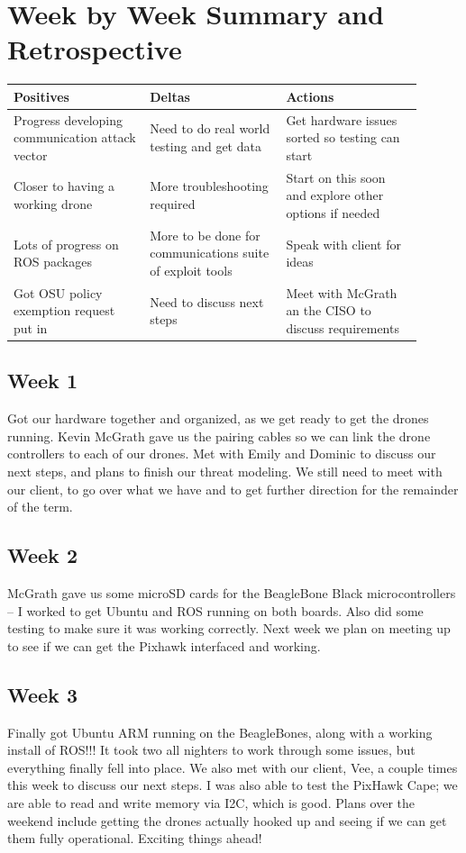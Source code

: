 \documentclass[IEEEtran,letterpaper,10pt,notitlepage,draftclsnofoot,onecolumn]{article}
\begin{document}
\section{Week by Week Summary and Retrospective}
  \begin{center}
  \begin{tabular}{ |p{0.3\linewidth}|p{0.3\linewidth}|p{0.3\linewidth}| }
   \hline
   \centering Positives &
   \centering Deltas &
   \centering Actions \tabularnewline
   \hline
   Progress developing communication attack vector &
   Need to do real world testing and get data &
   Get hardware issues sorted so testing can start \tabularnewline
   \hline
   Closer to having a working drone &
   More troubleshooting required &
   Start on this soon and explore other options if needed \tabularnewline
   \hline
   Lots of progress on ROS packages &
   More to be done for communications suite of exploit tools &
   Speak with client for ideas \tabularnewline
   \hline
   Got OSU policy exemption request put in &
   Need to discuss next steps &
   Meet with McGrath an the CISO to discuss requirements \tabularnewline
   \hline
  \end{tabular}
  \end{center}

  \subsection{Week 1}
  Got our hardware together and organized, as we get ready to get the drones running. Kevin McGrath gave us the pairing cables so we can link the drone controllers to each of our drones. Met with Emily and Dominic to discuss our next steps, and plans to finish our threat modeling. We still need to meet with our client, to go over what we have and to get further direction for the remainder of the term.

  \subsection{Week 2}
  McGrath gave us some microSD cards for the BeagleBone Black microcontrollers -- I worked to get Ubuntu and ROS running on both boards. Also did some testing to make sure it was working correctly. Next week we plan on meeting up to see if we can get the Pixhawk interfaced and working.

  \subsection{Week 3}
  Finally got Ubuntu ARM running on the BeagleBones, along with a working install of ROS!!! It took two all nighters to work through some issues, but everything finally fell into place. We also met with our client, Vee, a couple times this week to discuss our next steps. I was also able to test the PixHawk Cape; we are able to read and write memory via I2C, which is good. Plans over the weekend include getting the drones actually hooked up and seeing if we can get them fully operational. Exciting things ahead!
\end{document}
